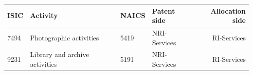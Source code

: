 \begin{tabular}{llllr}
\toprule
ISIC & Activity & NAICS & Patent side & Allocation side \\
\midrule
7494 & Photographic activities & 5419 & NRI-Services & RI-Services \\
9231 & Library and archive activities & 5191 & NRI-Services & RI-Services \\
\bottomrule
\end{tabular}
